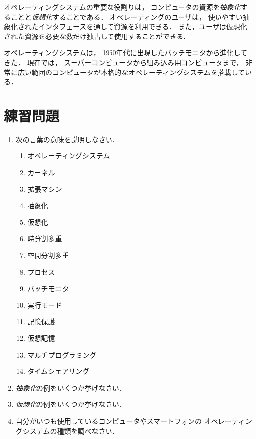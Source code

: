 オペレーティングシステムの重要な役割りは，
コンピュータの資源を\emph{抽象化}することと\emph{仮想化}することである．
オペレーティングのユーザは，
使いやすい抽象化されたインタフェースを通して資源を利用できる．
また，ユーザは仮想化された資源を必要な数だけ独占して使用することができる．

オペレーティングシステムは，
1950年代に出現したバッチモニタから進化してきた．
現在では，
スーパーコンピュータから組み込み用コンピュータまで，
非常に広い範囲のコンピュータが本格的なオペレーティングシステムを搭載している．

\newpage
\section*{練習問題}
\begin{enumerate}
  \renewcommand{\labelenumi}{\ttfamily\arabic{chapter}.\arabic{enumi}}
  \setlength{\leftskip}{1em}
\item 次の言葉の意味を説明しなさい．
  \begin{enumerate}
    \item オペレーティングシステム
    \item カーネル
    \item 拡張マシン
    \item 抽象化
    \item 仮想化
    \item 時分割多重
    \item 空間分割多重
    \item プロセス
    \item バッチモニタ
    \item 実行モード
    \item 記憶保護
    \item 仮想記憶
    \item マルチプログラミング
    \item タイムシェアリング
  \end{enumerate}
\item \emph{抽象化}の例をいくつか挙げなさい．
\item \emph{仮想化}の例をいくつか挙げなさい．
\item 自分がいつも使用しているコンピュータやスマートフォンの
  オペレーティングシステムの種類を調べなさい．
\end{enumerate}
